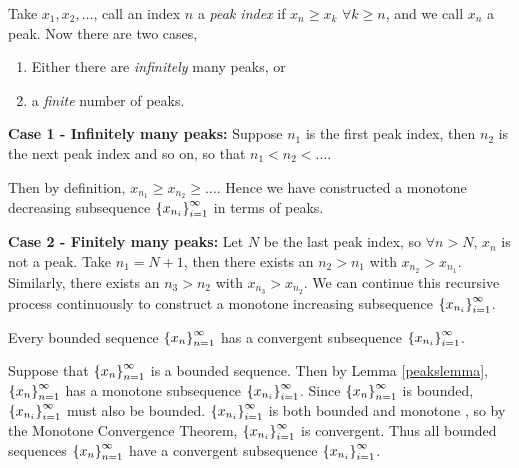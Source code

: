 \documentclass[12pt]{article}
\theoremstyle{definition}
\renewenvironment{proof}[1][\proofname]{\vspace{-10pt}\begin{replacementproof}}{\end{replacementproof}}
\newcommand{\xn}{\set{x_{n}}_{n = 1}^{\infty}}
\begin{document}
    \begin{proof}
        Take $x_{1}, x_{2}, \dots$, call an index $n$ a \textit{peak index} if $x_{n} \geq x_{k}$ $\forall k \geq n$, and we call $x_{n}$ a peak. 
        Now there are two cases, 
        \begin{enumerate}
            \item Either there are \textit{infinitely} many peaks, or
            \item a \textit{finite} number of peaks. 
        \end{enumerate}

        \textbf{Case 1 - Infinitely many peaks:}
        Suppose $n_{1}$ is the first peak index, then $n_{2}$ is the next peak index and so on, so that $n_{1} < n_{2} < \dots$. 
        
        Then by definition, $x_{n_{1}} \geq x_{n_{2}} \geq \dots$. Hence we have constructed a monotone decreasing subsequence $\left\{x_{n_{i}}\right\}_{i = 1}^{\infty}$ in terms of peaks.

        \textbf{Case 2 - Finitely many peaks:}
        Let $N$ be the last peak index, so $\forall n > N$, $x_{n}$ is not a peak. 
        Take $n_{1} = N + 1$, then there exists an $n_{2} > n_{1}$ with $x_{n_{2}} > x_{n_{1}}$. Similarly, there exists an $n_{3} > n_{2}$ with $x_{n_{3}} > x_{n_{2}}$. We can continue this recursive process continuously to construct a monotone increasing subsequence $\left\{x_{n_{i}}\right\}_{i = 1}^{\infty}$.
    \end{proof}

    \begin{theorem}
        Every bounded sequence $\xn$ has a convergent subsequence $\left\{x_{n_{i}}\right\}_{i = 1}^{\infty}$.
    \end{theorem}

    \begin{proof}
        Suppose that $\xn$ is a bounded sequence. Then by Lemma \ref{peakslemma}, $\xn$ has a monotone subsequence $\left\{x_{n_{i}}\right\}_{i = 1}^{\infty}$. Since $\xn$ is bounded, $\left\{x_{n_{i}}\right\}_{i = 1}^{\infty}$ must also be bounded. $\left\{x_{n_{i}}\right\}_{i = 1}^{\infty}$ is both bounded and monotone , so by the Monotone Convergence Theorem, $\left\{x_{n_{i}}\right\}_{i = 1}^{\infty}$ is convergent. Thus all bounded sequences $\xn$ have a convergent subsequence $\left\{x_{n_{i}}\right\}_{i = 1}^{\infty}$.
    \end{proof}
\end{document}
